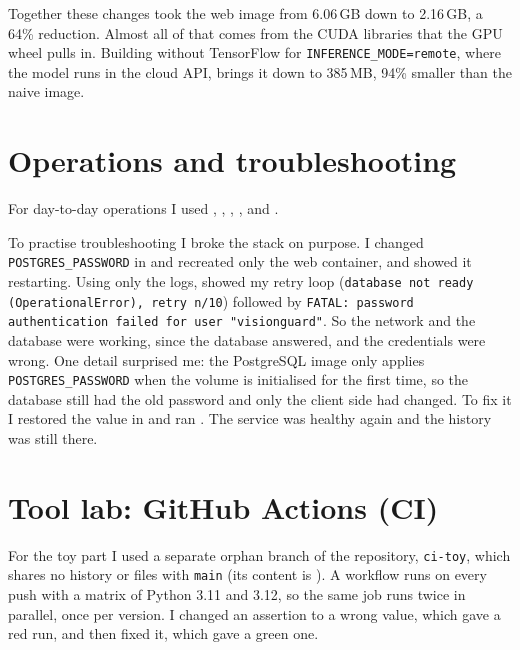 Together these changes took the web image from 6.06\,GB down to 2.16\,GB, a 64\% reduction. Almost
all of that comes from the CUDA libraries that the GPU wheel pulls in. Building without TensorFlow
for \texttt{INFERENCE\_MODE=remote}, where the model runs in the cloud API, brings it down to
385\,MB, 94\% smaller than the naive image.

\section{Operations and troubleshooting}
For day-to-day operations I used , , ,
,  and
.

To practise troubleshooting I broke the stack on purpose. I changed \texttt{POSTGRES\_PASSWORD} in
 and recreated only the web container, and  showed it restarting.
Using only the logs,  showed my retry loop
(\texttt{database not ready (OperationalError), retry n/10}) followed by
\texttt{FATAL: password authentication failed for user "visionguard"}. So the network and the
database were working, since the database answered, and the credentials were wrong. One detail
surprised me: the PostgreSQL image only applies \texttt{POSTGRES\_PASSWORD} when the volume is
initialised for the first time, so the database still had the old password and only the client
side had changed. To fix it I restored the value in  and ran
. The service was healthy again and the history was
still there.

\section{Tool lab: GitHub Actions (CI)}\label{sec:6-6}
For the toy part I used a separate orphan branch of the repository, \texttt{ci-toy}, which shares
no history or files with \texttt{main} (its content is ). A workflow runs on
every push with a matrix of Python 3.11 and 3.12, so the same job runs twice in parallel, once per
version. I changed an assertion to a wrong value, which gave a red run, and then fixed it, which
gave a green one.

